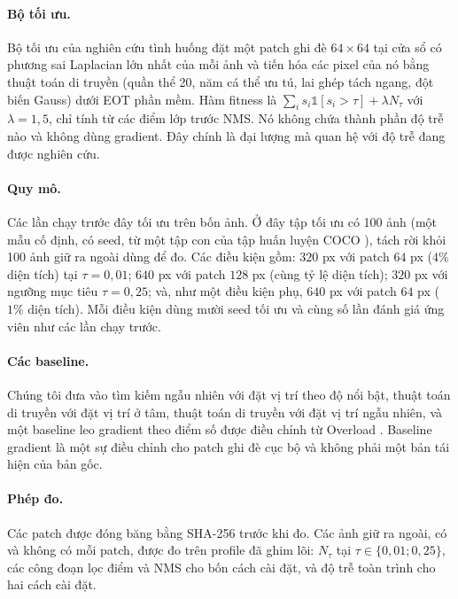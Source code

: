 \documentclass[a4paper,fleqn]{cas-dc}
\newcommand{\Ntau}{N_{\tau}}
\begin{document}
\paragraph{Bộ tối ưu.}
Bộ tối ưu của nghiên cứu tình huống đặt một patch ghi đè $64\times64$ tại cửa sổ có phương sai Laplacian lớn nhất của mỗi ảnh và tiến hóa các pixel của nó bằng thuật toán di truyền (quần thể 20, năm cá thể ưu tú, lai ghép tách ngang, đột biến Gauss) dưới EOT phần mềm. Hàm fitness là $\sum_i s_i \mathbb{1}[s_i>\tau]+\lambda \Ntau$ với $\lambda=1{,}5$, chỉ tính từ các điểm lớp trước NMS. Nó không chứa thành phần độ trễ nào và không dùng gradient. Đây chính là đại lượng mà quan hệ với độ trễ đang được nghiên cứu.

\paragraph{Quy mô.}
Các lần chạy trước đây tối ưu trên bốn ảnh. Ở đây tập tối ưu có 100 ảnh (một mẫu cố định, có seed, từ một tập con của tập huấn luyện COCO \cite{lin2014coco}), tách rời khỏi 100 ảnh giữ ra ngoài dùng để đo. Các điều kiện gồm: $320$ px với patch $64$ px ($4\%$ diện tích) tại $\tau=0{,}01$; $640$ px với patch $128$ px (cùng tỷ lệ diện tích); $320$ px với ngưỡng mục tiêu $\tau=0{,}25$; và, như một điều kiện phụ, $640$ px với patch $64$ px ($1\%$ diện tích). Mỗi điều kiện dùng mười seed tối ưu và cùng số lần đánh giá ứng viên như các lần chạy trước.

\paragraph{Các baseline.}
Chúng tôi đưa vào tìm kiếm ngẫu nhiên với đặt vị trí theo độ nổi bật, thuật toán di truyền với đặt vị trí ở tâm, thuật toán di truyền với đặt vị trí ngẫu nhiên, và một baseline leo gradient theo điểm số được điều chỉnh từ Overload \cite{overload2024}. Baseline gradient là một sự điều chỉnh cho patch ghi đè cục bộ và không phải một bản tái hiện của bản gốc.

\paragraph{Phép đo.}
Các patch được đóng băng bằng SHA-256 trước khi đo. Các ảnh giữ ra ngoài, có và không có mỗi patch, được đo trên profile đã ghim lõi: $\Ntau$ tại $\tau\in\{0{,}01;0{,}25\}$, các công đoạn lọc điểm và NMS cho bốn cách cài đặt, và độ trễ toàn trình cho hai cách cài đặt.
\end{document}
